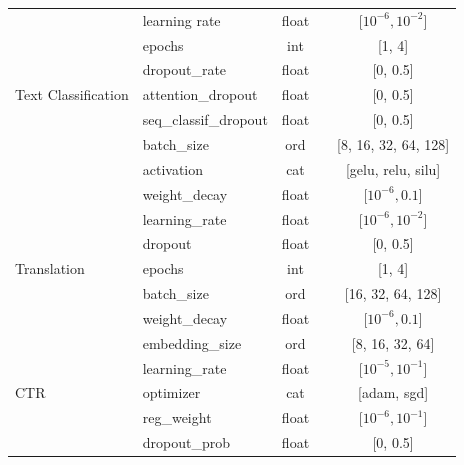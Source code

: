 \documentclass{article}
\newcommand{\cmark}{\ding{51}} %
\newcommand{\xmark}{\ding{55}} %
\begin{document}
\begin{longtable}{@{}p{}lccc@{}}
\midrule
\multirow{7}{=}{Text Classification} & learning rate  & float & \textcolor{checkcolor}{\cmark} & [$10^{-6}, 10^{-2}$] \\
                       & epochs & int & \textcolor{crosscolor}{\xmark} & [1, 4] \\
                       & dropout\_rate         & float & \textcolor{crosscolor}{\xmark} & [0, 0.5] \\
                       & attention\_dropout      & float  & \textcolor{crosscolor}{\xmark} & [0, 0.5] \\
                       & seq\_classif\_dropout   & float  & \textcolor{crosscolor}{\xmark} & [0, 0.5] \\
                       & batch\_size      & ord  & \textcolor{crosscolor}{\xmark} & [8, 16, 32, 64, 128] \\
                       & activation              & cat  & \textcolor{crosscolor}{\xmark} & [gelu, relu, silu] \\
                       & weight\_decay           & float  & \textcolor{checkcolor}{\cmark} & [$10^{-6}, 0.1$] \\
\midrule
\multirow{5}{=}{Translation} & learning\_rate  & float & \textcolor{checkcolor}{\cmark} & [$10^{-6}, 10^{-2}$] \\
                       & dropout        & float & \textcolor{crosscolor}{\xmark} & [0, 0.5] \\
                       & epochs & int & \textcolor{crosscolor}{\xmark} & [1, 4] \\
                       & batch\_size & ord & \textcolor{crosscolor}{\xmark} & [16, 32, 64, 128] \\
                       & weight\_decay      & float  & \textcolor{checkcolor}{\cmark} & [$10^{-6}, 0.1$] \\
\midrule
\multirow{8}{=}{CTR} & embedding\_size    & ord   & \textcolor{crosscolor}{\xmark} & [8, 16, 32, 64] \\
                                 & learning\_rate     & float & \textcolor{checkcolor}{\cmark} & [$10^{-5}, 10^{-1}$] \\
                                 & optimizer            & cat   & \textcolor{crosscolor}{\xmark} & [adam, sgd] \\
                                 & reg\_weight        & float & \textcolor{checkcolor}{\cmark} & [$10^{-6}, 10^{-1}$] \\
                                 & dropout\_prob      & float & \textcolor{crosscolor}{\xmark} & [0, 0.5] \\

\end{longtable}
\end{document}
